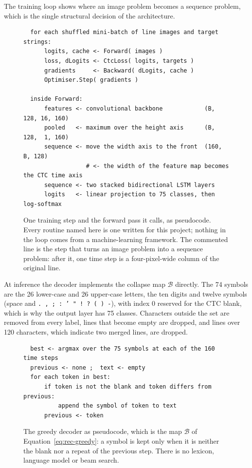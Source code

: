 The training loop shows where an image problem becomes a sequence problem, which is the single structural decision of the architecture.

\begin{figure}[h]
\centering
\fontsize{8.5}{10.2}\selectfont
\begin{verbatim}
  for each shuffled mini-batch of line images and target strings:
      logits, cache <- Forward( images )
      loss, dLogits <- CtcLoss( logits, targets )
      gradients     <- Backward( dLogits, cache )
      Optimiser.Step( gradients )

  inside Forward:
      features <- convolutional backbone            (B, 128, 16, 160)
      pooled   <- maximum over the height axis      (B, 128,  1, 160)
      sequence <- move the width axis to the front  (160, B, 128)
                  # <- the width of the feature map becomes the CTC time axis
      sequence <- two stacked bidirectional LSTM layers
      logits   <- linear projection to 75 classes, then log-softmax
\end{verbatim}
\caption{One training step and the forward pass it calls, as pseudocode. Every routine named here is one written for this project; nothing in the loop comes from a machine-learning framework. The commented line is the step that turns an image problem into a sequence problem: after it, one time step is a four-pixel-wide column of the original line.}
\label{fig:rec-trainpseudo}
\end{figure}

At inference the decoder implements the collapse map $\mathcal B$ directly.
The 74 symbols are the 26 lower-case and 26 upper-case letters, the ten digits and twelve symbols (space and \texttt{.\,,\,;\,:\,'\,"\,!\,?\,(\,)\,-}), with index 0 reserved for the CTC blank, which is why the output layer has 75 classes.
Characters outside the set are removed from every label, lines that become empty are dropped, and lines over 120 characters, which indicate two merged lines, are dropped.

\begin{figure}[h]
\centering
\fontsize{8.5}{10.2}\selectfont
\begin{verbatim}
  best <- argmax over the 75 symbols at each of the 160 time steps
  previous <- none ;  text <- empty
  for each token in best:
      if token is not the blank and token differs from previous:
          append the symbol of token to text
      previous <- token
\end{verbatim}
\caption{The greedy decoder as pseudocode, which is the map $\mathcal B$ of Equation~\ref{eq:rec-greedy}: a symbol is kept only when it is neither the blank nor a repeat of the previous step. There is no lexicon, language model or beam search.}
\label{fig:rec-decodepseudo}
\end{figure}

